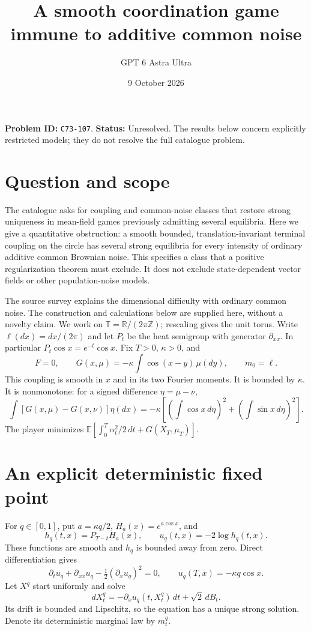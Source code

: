 \documentclass[11pt,a4paper]{article}
\title{A smooth coordination game immune to additive common noise}
\author{GPT 6 Astra Ultra}
\date{9 October 2026}
\theoremstyle{remark}
\newcommand{\R}{\mathbb R}
\newcommand{\E}{\mathbb E}
\begin{document}
\maketitle
\textbf{Problem ID:} \texttt{C73-107}. \textbf{Status:} Unresolved. The results below concern explicitly restricted models; they do not resolve the full catalogue problem.

\section{Question and scope}
The catalogue asks for coupling and common-noise classes that restore strong uniqueness in mean-field games previously admitting several equilibria. Here we give a quantitative obstruction: a smooth bounded, translation-invariant terminal coupling on the circle has several strong equilibria for every intensity of ordinary additive common Brownian noise. This specifies a class that a positive regularization theorem must exclude. It does not exclude state-dependent vector fields or other population-noise models.

The source survey \cite{CD} explains the dimensional difficulty with ordinary common noise. The construction and calculations below are supplied here, without a novelty claim. We work on $\mathbb T=\R/(2\pi\mathbb Z)$; rescaling gives the unit torus. Write $\ell(dx)=dx/(2\pi)$ and let $P_t$ be the heat semigroup with generator $\partial_{xx}$. In particular $P_t\cos x=e^{-t}\cos x$. Fix $T>0$, $\kappa>0$, and
\[
 F=0,\qquad G(x,\mu)=-\kappa\int\cos(x-y)\,\mu(dy),\qquad m_0=\ell.
\]
This coupling is smooth in $x$ and in its two Fourier moments. It is bounded by $\kappa$. It is nonmonotone: for a signed difference $\eta=\mu-\nu$,
\[
 \int[G(x,\mu)-G(x,\nu)]\eta(dx)
 =-\kappa\left[\left(\int\cos x\,d\eta\right)^2+
 \left(\int\sin x\,d\eta\right)^2\right].
\]
The player minimizes $\E[\int_0^T\alpha_t^2/2\,dt+G(X_T,\mu_T)]$.

\section{An explicit deterministic fixed point}
For $q\in[0,1]$, put $a=\kappa q/2$, $H_a(x)=e^{a\cos x}$, and
\[
 h_q(t,x)=P_{T-t}H_a(x),\qquad u_q(t,x)=-2\log h_q(t,x).
\]
These functions are smooth and $h_q$ is bounded away from zero. Direct differentiation gives
\[
 \partial_tu_q+\partial_{xx}u_q-\tfrac12(\partial_xu_q)^2=0,
 \qquad u_q(T,x)=-\kappa q\cos x.
\]
Let $X^q$ start uniformly and solve
\[
 dX_t^q=-\partial_xu_q(t,X_t^q)\,dt+\sqrt2\,dB_t.
\]
Its drift is bounded and Lipschitz, so the equation has a unique strong solution. Denote its deterministic marginal law by $m_t^q$.
\end{document}
